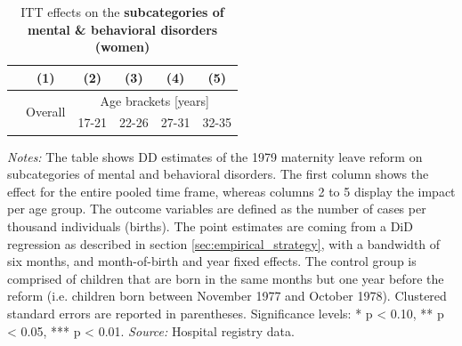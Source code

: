 \documentclass[11pt, a4paper]{article} %
\begin{document}
\newpage
{} 
\vspace*{\fill}
\begin{table}[H] \centering 
	\begin{threeparttable} \centering \caption{ITT effects on the \textbf{subcategories of mental \& behavioral disorders (women)}}\label{tab: ITT_across_d5subcategories_per_age_group_women}
		{\def\sym#1{\ifmmode^{#1}\else\(^{#1}\)\fi} 
			\begin{tabular}{l*{5}{c}}
				\toprule 
				&\multicolumn{1}{c}{(1)}&\multicolumn{1}{c}{(2)}&\multicolumn{1}{c}{(3)}&\multicolumn{1}{c}{(4)}&\multicolumn{1}{c}{(5)}\\
				\midrule
				&\multirow{2}{*}{Overall} & \multicolumn{4}{c}{Age brackets [years]} \\ 
				\cmidrule(lr){3-6}
				&&\multicolumn{1}{c}{17-21}&\multicolumn{1}{c}{22-26}&\multicolumn{1}{c}{27-31}&\multicolumn{1}{c}{32-35}\\
				
				\midrule
				
				
				
				\bottomrule 
		\end{tabular}}
	\end{threeparttable} 
	\begin{minipage}{0.9\linewidth}
		\scriptsize \emph{Notes:} The table shows DD estimates of the 1979 maternity leave reform on subcategories of mental and behavioral disorders. The first column shows the effect for the entire pooled time frame, whereas columns 2 to 5 display the impact per age group. The outcome variables are defined as the number of cases per thousand individuals (births). The point estimates are coming from a DiD regression as described in section \ref{sec:empirical_strategy}, with a bandwidth of six months, and month-of-birth and year fixed effects. The control group is comprised of children that are born in the same months but one year before the reform (i.e. children born between November 1977 and October 1978). Clustered standard errors are reported in parentheses. \newline Significance levels: * p < 0.10, ** p < 0.05, *** p < 0.01. \newline 	\emph{Source:} Hospital registry data.
	\end{minipage}
\end{table} 
\vspace*{\fill}\clearpage 
\restoregeometry
\end{document}
